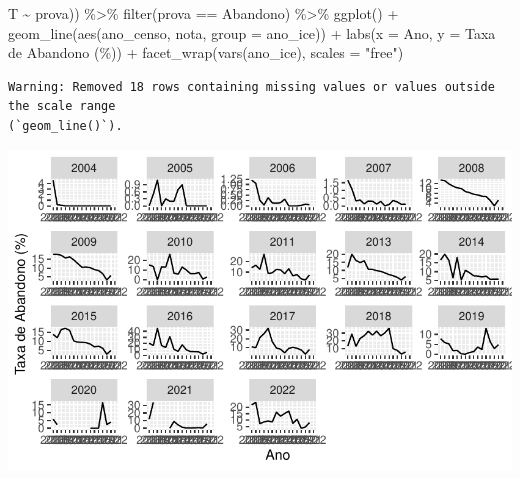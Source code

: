 \documentclass[
  letterpaper,
  DIV=11,
  numbers=noendperiod]{scrartcl}
\newenvironment{Shaded}{\begin{snugshade}}{\end{snugshade}}
\newcommand{\AttributeTok}[1]{\textcolor[rgb]{0.40,0.45,0.13}{#1}}
\newcommand{\FunctionTok}[1]{\textcolor[rgb]{0.28,0.35,0.67}{#1}}
\newcommand{\NormalTok}[1]{\textcolor[rgb]{0.00,0.23,0.31}{#1}}
\newcommand{\SpecialCharTok}[1]{\textcolor[rgb]{0.37,0.37,0.37}{#1}}
\newcommand{\StringTok}[1]{\textcolor[rgb]{0.13,0.47,0.30}{#1}}
\begin{document}
\begin{Shaded}
\begin{Highlighting}[]
\NormalTok{                         T }\SpecialCharTok{\textasciitilde{}}\NormalTok{ prova)) }\SpecialCharTok{\%\textgreater{}\%} 
  \FunctionTok{filter}\NormalTok{(prova }\SpecialCharTok{==} \StringTok{\textquotesingle{}Abandono\textquotesingle{}}\NormalTok{) }\SpecialCharTok{\%\textgreater{}\%} 
  \FunctionTok{ggplot}\NormalTok{() }\SpecialCharTok{+}
  \FunctionTok{geom\_line}\NormalTok{(}\FunctionTok{aes}\NormalTok{(ano\_censo, nota, }\AttributeTok{group =}\NormalTok{ ano\_ice)) }\SpecialCharTok{+}
  \FunctionTok{labs}\NormalTok{(}\AttributeTok{x =} \StringTok{\textquotesingle{}Ano\textquotesingle{}}\NormalTok{, }\AttributeTok{y =} \StringTok{\textquotesingle{}Taxa de Abandono (\%)\textquotesingle{}}\NormalTok{) }\SpecialCharTok{+}
  \FunctionTok{facet\_wrap}\NormalTok{(}\FunctionTok{vars}\NormalTok{(ano\_ice), }\AttributeTok{scales =} \StringTok{"free"}\NormalTok{)}
\end{Highlighting}
\end{Shaded}

\begin{verbatim}
Warning: Removed 18 rows containing missing values or values outside the scale range
(`geom_line()`).
\end{verbatim}

\includegraphics{script_files/figure-latex/unnamed-chunk-12-3.pdf}
\end{document}
